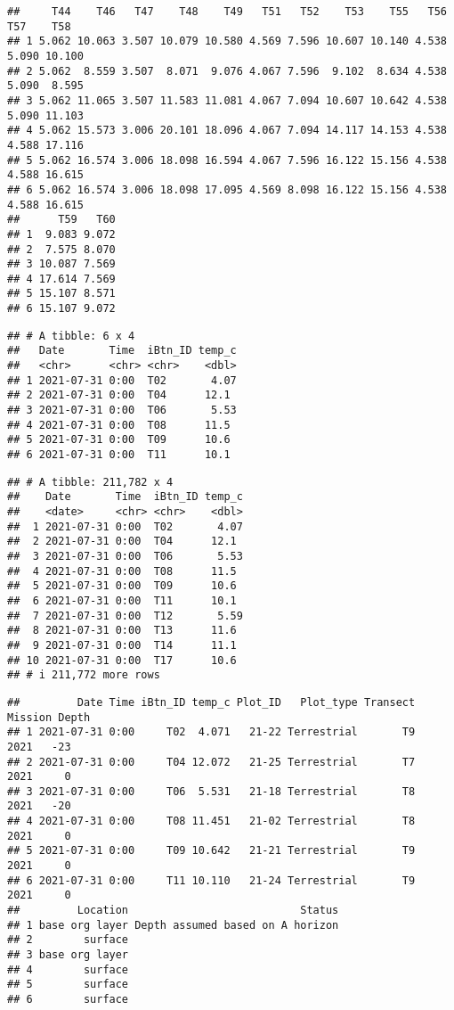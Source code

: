 \documentclass[
]{article}
\begin{document}
\begin{verbatim}
##     T44    T46   T47    T48    T49   T51   T52    T53    T55   T56   T57    T58
## 1 5.062 10.063 3.507 10.079 10.580 4.569 7.596 10.607 10.140 4.538 5.090 10.100
## 2 5.062  8.559 3.507  8.071  9.076 4.067 7.596  9.102  8.634 4.538 5.090  8.595
## 3 5.062 11.065 3.507 11.583 11.081 4.067 7.094 10.607 10.642 4.538 5.090 11.103
## 4 5.062 15.573 3.006 20.101 18.096 4.067 7.094 14.117 14.153 4.538 4.588 17.116
## 5 5.062 16.574 3.006 18.098 16.594 4.067 7.596 16.122 15.156 4.538 4.588 16.615
## 6 5.062 16.574 3.006 18.098 17.095 4.569 8.098 16.122 15.156 4.538 4.588 16.615
##      T59   T60
## 1  9.083 9.072
## 2  7.575 8.070
## 3 10.087 7.569
## 4 17.614 7.569
## 5 15.107 8.571
## 6 15.107 9.072
\end{verbatim}

\begin{verbatim}
## # A tibble: 6 x 4
##   Date       Time  iBtn_ID temp_c
##   <chr>      <chr> <chr>    <dbl>
## 1 2021-07-31 0:00  T02       4.07
## 2 2021-07-31 0:00  T04      12.1 
## 3 2021-07-31 0:00  T06       5.53
## 4 2021-07-31 0:00  T08      11.5 
## 5 2021-07-31 0:00  T09      10.6 
## 6 2021-07-31 0:00  T11      10.1
\end{verbatim}

\begin{verbatim}
## # A tibble: 211,782 x 4
##    Date       Time  iBtn_ID temp_c
##    <date>     <chr> <chr>    <dbl>
##  1 2021-07-31 0:00  T02       4.07
##  2 2021-07-31 0:00  T04      12.1 
##  3 2021-07-31 0:00  T06       5.53
##  4 2021-07-31 0:00  T08      11.5 
##  5 2021-07-31 0:00  T09      10.6 
##  6 2021-07-31 0:00  T11      10.1 
##  7 2021-07-31 0:00  T12       5.59
##  8 2021-07-31 0:00  T13      11.6 
##  9 2021-07-31 0:00  T14      11.1 
## 10 2021-07-31 0:00  T17      10.6 
## # i 211,772 more rows
\end{verbatim}

\begin{verbatim}
##         Date Time iBtn_ID temp_c Plot_ID   Plot_type Transect Mission Depth
## 1 2021-07-31 0:00     T02  4.071   21-22 Terrestrial       T9    2021   -23
## 2 2021-07-31 0:00     T04 12.072   21-25 Terrestrial       T7    2021     0
## 3 2021-07-31 0:00     T06  5.531   21-18 Terrestrial       T8    2021   -20
## 4 2021-07-31 0:00     T08 11.451   21-02 Terrestrial       T8    2021     0
## 5 2021-07-31 0:00     T09 10.642   21-21 Terrestrial       T9    2021     0
## 6 2021-07-31 0:00     T11 10.110   21-24 Terrestrial       T9    2021     0
##         Location                           Status
## 1 base org layer Depth assumed based on A horizon
## 2        surface                                 
## 3 base org layer                                 
## 4        surface                                 
## 5        surface                                 
## 6        surface
\end{verbatim}
\end{document}
